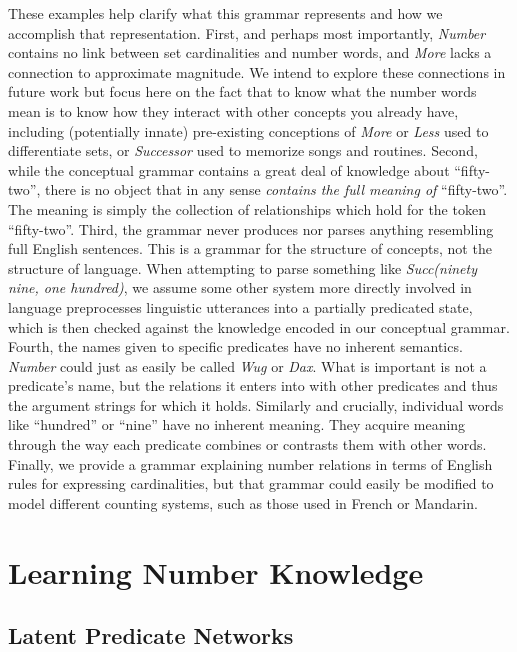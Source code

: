 \documentclass[10pt,letterpaper]{article}
\begin{document}
These examples help clarify what this grammar represents and how we
accomplish that representation. First, and perhaps most importantly,
\emph{Number} contains no link between set cardinalities and number
words, and \emph{More} lacks a connection to approximate magnitude. We
intend to explore these connections in future work but focus here on
the fact that to know what the number words mean is to know how they
interact with other concepts you already have, including (potentially
innate) pre-existing conceptions of \emph{More} or \emph{Less} used to
differentiate sets, or \emph{Successor} used to memorize songs and
routines. Second, while the conceptual grammar contains a great deal
of knowledge about ``fifty-two'', there is no object that in any sense
\emph{contains the full meaning of} ``fifty-two''. The meaning is
simply the collection of relationships which hold for the token
``fifty-two''. Third, the grammar never produces nor parses anything
resembling full English sentences. This is a grammar for the structure
of concepts, not the structure of language. When attempting to parse
something like \emph{Succ(ninety nine, one hundred)}, we assume some
other system more directly involved in language preprocesses
linguistic utterances into a partially predicated state, which is then
checked against the knowledge encoded in our conceptual grammar.
Fourth, the names given to specific predicates have no inherent
semantics. \emph{Number} could just as easily be called \emph{Wug} or
\emph{Dax}. What is important is not a predicate's name, but the
relations it enters into with other predicates and thus the argument
strings for which it holds. Similarly and crucially, individual words
like ``hundred'' or ``nine'' have no inherent meaning. They acquire
meaning through the way each predicate combines or contrasts them with
other words. Finally, we provide a grammar explaining number relations
in terms of English rules for expressing cardinalities, but that
grammar could easily be modified to model different counting systems,
such as those used in French or Mandarin.

\section{Learning Number Knowledge}


\subsection{Latent Predicate Networks}
\end{document}

